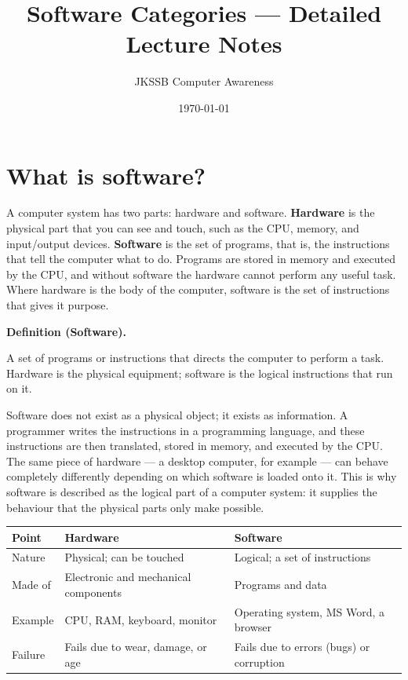 \documentclass[11pt]{article}
\title{Software Categories --- Detailed Lecture Notes}
\author{JKSSB Computer Awareness}
\date{\today}
\newenvironment{definitionbox}[1]{%
  \par\noindent\textbf{Definition (#1).}\ \itshape
}{\par\vspace{0.3em}}
\begin{document}
\maketitle

\section{What is software?}
A computer system has two parts: hardware and software. \textbf{Hardware} is
the physical part that you can see and touch, such as the CPU, memory, and
input/output devices. \textbf{Software} is the set of programs, that is, the
instructions that tell the computer what to do. Programs are stored in memory
and executed by the CPU, and without software the hardware cannot perform any
useful task. Where hardware is the body of the computer, software is the set
of instructions that gives it purpose.

\begin{definitionbox}{Software}
A set of programs or instructions that directs the computer to perform a
task. Hardware is the physical equipment; software is the logical
instructions that run on it.
\end{definitionbox}

Software does not exist as a physical object; it exists as information. A
programmer writes the instructions in a programming language, and these
instructions are then translated, stored in memory, and executed by the CPU.
The same piece of hardware --- a desktop computer, for example --- can behave
completely differently depending on which software is loaded onto it. This is
why software is described as the logical part of a computer system: it
supplies the behaviour that the physical parts only make possible.

\begin{center}
\begin{tabular}{p{}p{}p{}}
\toprule
\textbf{Point} & \textbf{Hardware} & \textbf{Software} \\
\midrule
Nature & Physical; can be touched & Logical; a set of instructions \\
Made of & Electronic and mechanical components & Programs and data \\
Example & CPU, RAM, keyboard, monitor & Operating system, MS Word, a browser \\
Failure & Fails due to wear, damage, or age & Fails due to errors (bugs) or corruption \\
\bottomrule
\end{tabular}
\end{center}
\end{document}
